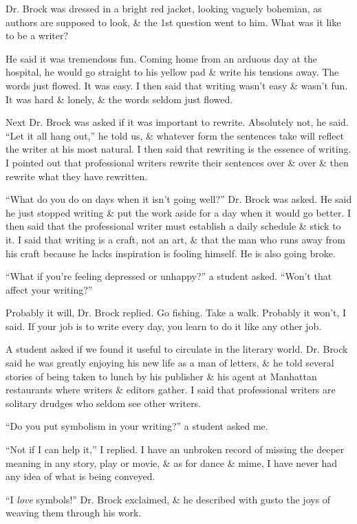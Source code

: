 \documentclass{article}
\begin{document}
Dr. Brock was dressed in a bright red jacket, looking vaguely bohemian, as authors are supposed to look, \& the 1st question went to him. What was it like to be a writer?

He said it was tremendous fun. Coming home from an arduous day at the hospital, he would go straight to his yellow pad \& write his tensions away. The words just flowed. It was easy. I then said that writing wasn't easy \& wasn't fun. It was hard \& lonely, \& the words seldom just flowed.

Next Dr. Brock was asked if it was important to rewrite. Absolutely not, he said. ``Let it all hang out,'' he told us, \& whatever form the sentences take will reflect the writer at his most natural. I then said that rewriting is the essence of writing. I pointed out that professional writers rewrite their sentences over \& over \& then rewrite what they have rewritten.

``What do you do on days when it isn't going well?'' Dr. Brock was asked. He said he just stopped writing \& put the work aside for a day when it would go better. I then said that the professional writer must establish a daily schedule \& stick to it. I said that writing is a craft, not an art, \& that the man who runs away from his craft because he lacks inspiration is fooling himself. He is also going broke.

``What if you're feeling depressed or unhappy?'' a student asked. ``Won't that affect your writing?''

Probably it will, Dr. Brock replied. Go fishing. Take a walk. Probably it won't, I said. If your job is to write every day, you learn to do it like any other job.

A student asked if we found it useful to circulate in the literary world. Dr. Brock said he was greatly enjoying his new life as a man of letters, \& he told several stories of being taken to lunch by his publisher \& his agent at Manhattan restaurants where writers \& editors gather. I said that professional writers are solitary drudges who seldom see other writers.

``Do you put symbolism in your writing?'' a student asked me.

``Not if I can help it,'' I replied. I have an unbroken record of missing the deeper meaning in any story, play or movie, \& as for dance \& mime, I have never had any idea of what is being conveyed.

``I \textit{love} symbols!'' Dr. Brock exclaimed, \& he described with gusto the joys of weaving them through his work.
\end{document}

